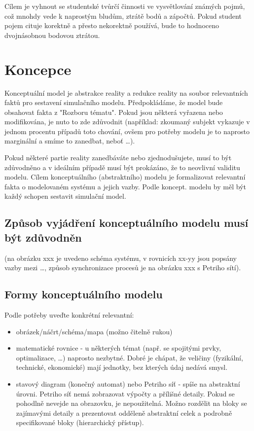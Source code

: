\documentclass{scrartcl}
\begin{document}
Cílem je vyhnout se studentské tvůrčí činnosti ve vysvětlování známých pojmů,
což mnohdy vede k naprostým bludům, ztrátě bodů a zápočtů. Pokud student pojem
cituje korektně a přesto nekorektně používá, bude to hodnoceno dvojnásobnou
bodovou ztrátou.

\section{Koncepce}
\label{sec-3}
Konceptuální model je abstrakce reality a redukce reality na soubor relevantních
faktů pro sestavení simulačního modelu. Předpokládáme, že model bude obsahovat
fakta z "Rozboru tématu". Pokud jsou některá vyřazena nebo modifikována, je nuto
to zde zdůvodnit (například: zkoumaný subjekt vykazuje v jednom procentu případů
toto chování, ovšem pro potřeby modelu je to naprosto marginální a smíme to
zanedbat, neboť \ldots{}).

Pokud některé partie reality zanedbáváte nebo zjednodušujete, musí to být
zdůvodněno a v ideálním případě musí být prokázáno, že to neovlivní validitu
modelu. Cílem konceptuálního (abstraktního) modelu je formalizovat relevantní
fakta o modelovaném systému a jejich vazby. Podle koncept. modelu by měl být
každý schopen sestavit simulační model.

\subsection{Způsob vyjádření konceptuálního modelu musí být zdůvodněn}
\label{sec-3-1}
(na obrázku xxx je uvedeno schéma systému, v rovnicích xx-yy jsou popsány vazby
mezi \ldots{}, způsob synchronizace procesů je na obrázku xxx s Petriho sítí).

\subsection{Formy konceptuálního modelu}
\label{sec-3-2}
Podle potřeby uveďte konkrétní relevantní:
\begin{itemize}
\item obrázek/náčrt/schéma/mapa (možno čitelně rukou)
\item matematické rovnice - u některých témat (např. se spojitými prvky,
optimalizace, \ldots{}) naprosto nezbytné. Dobré je chápat, že veličiny (fyzikální,
technické, ekonomické) mají jednotky, bez kterých údaj nedává smysl.
\item stavový diagram (konečný automat) nebo Petriho síť - spíše na abstraktní
úrovni. Petriho síť nemá zobrazovat výpočty a přílišné detaily. Pokud se
pohodlně nevejde na obrazovku, je nepoužitelná. Možno rozdělit na bloky se
zajímavými detaily a prezentovat odděleně abstraktní celek a podrobně
specifikované bloky (hierarchický přístup).
\end{itemize}
\end{document}
